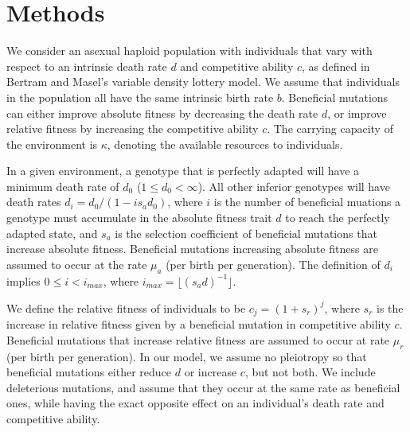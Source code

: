 \documentclass[9pt,twocolumn,twoside]{article}
\begin{document}
\section{Methods}
We consider an asexual haploid population with individuals that vary with respect to an intrinsic death rate $d$ and competitive ability $c$, as defined in Bertram and Masel's \citep{bertram2019density} variable density lottery model. We assume that individuals in the population all have the same intrinsic birth rate $b$. Beneficial mutations can either improve absolute fitness by decreasing the death rate $d$, or improve relative fitness by increasing the competitive ability $c$. The carrying capacity of the environment is $\kappa$, denoting the available resources to individuals.

In a given environment, a genotype that is perfectly adapted will have a minimum death rate of $d_0$ ($1 \leq d_0 < \infty$). All other inferior genotypes will have death rates $d_i = d_0/(1-is_a d_0)$, where $i$ is the number of beneficial muations a genotype must accumulate in the absolute fitness trait $d$ to reach the perfectly adapted state, and $s_a$ is the selection coefficient of beneficial mutations that increase absolute fitness. Beneficial mutations increasing absolute fitness are assumed to occur at the rate $\mu_a$ (per birth per generation). The definition of $d_i$ implies $0 \leq i < i_{max}$, where $i_{max}  = \lfloor (s_a d)^{-1}\rfloor $. 

We define the relative fitness of individuals to be $c_j = (1+s_r)^j$, where $s_r$ is the increase in relative fitness given by a beneficial mutation in competitive ability $c$. Beneficial mutations that increase relative fitness are assumed to occur at rate $\mu_r$ (per birth per generation). In our model, we assume no pleiotropy so that beneficial mutations either reduce $d$ or increase $c$, but not both. We include deleterious mutations, and assume that they occur at the same rate as beneficial ones, while having the exact opposite effect on an individual's death rate and competitive ability. 
\end{document}
